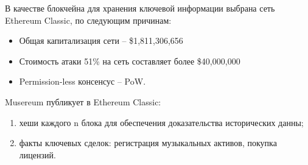 \documentclass[12pt]{report}
\begin{document}
В качестве блокчейна для хранения ключевой информации выбрана сеть Ethereum Classic, по следующим причинам:
\begin{itemize}
	\item Общая капитализация сети – \$1,811,306,656
	\item Стоимость атаки 51\% на сеть составляет более \$40,000,000
	\item Permission-less консенсус – PoW.
\end{itemize}

Musereum публикует в Ethereum Classic:
\begin{enumerate}
	\item хеши каждого n блока для обеспечения доказательства исторических данны;
	\item факты ключевых сделок: регистрация музыкальных активов, покупка лицензий.
\end{enumerate}
\end{document}
